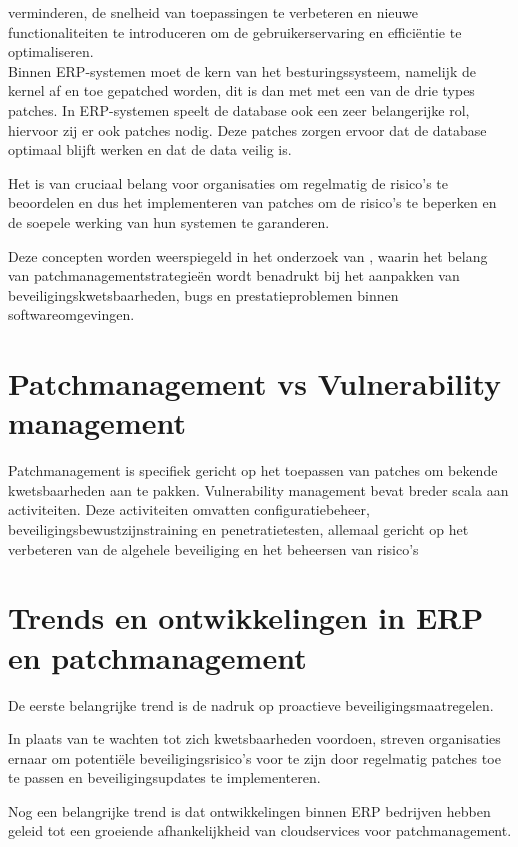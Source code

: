verminderen, de snelheid van toepassingen te verbeteren en nieuwe functionaliteiten te introduceren om de gebruikerservaring en efficiëntie te optimaliseren. \\

Binnen ERP-systemen moet de kern van het besturingssysteem, namelijk de kernel af en toe gepatched worden, dit is dan met met een van de drie types patches. In ERP-systemen speelt de database ook een zeer belangerijke rol, hiervoor zij er ook patches nodig. Deze patches zorgen ervoor dat de database optimaal blijft werken en dat de data veilig is.

Het is van cruciaal belang voor organisaties om regelmatig de risico's te beoordelen en dus het implementeren van patches om de risico's te beperken en de soepele werking van hun systemen te garanderen.

Deze concepten worden weerspiegeld in het onderzoek van \textcite{Wrobel2023}, waarin het belang van patchmanagementstrategieën wordt benadrukt bij het aanpakken van beveiligingskwetsbaarheden, bugs en prestatieproblemen binnen softwareomgevingen.

\section{Patchmanagement vs Vulnerability management}
Patchmanagement is specifiek gericht op het toepassen van patches om bekende kwetsbaarheden aan te pakken. Vulnerability management bevat breder scala aan activiteiten. Deze activiteiten omvatten configuratiebeheer, beveiligingsbewustzijnstraining en penetratietesten, allemaal gericht op het verbeteren van de algehele beveiliging en het beheersen van risico’s \autocite{Danby2023}


\section{Trends en ontwikkelingen in  ERP en patchmanagement}

De eerste belangrijke trend is de nadruk op proactieve beveiligingsmaatregelen.

In plaats van te wachten tot zich kwetsbaarheden voordoen, streven organisaties ernaar om potentiële beveiligingsrisico's voor te zijn door regelmatig patches toe te passen en beveiligingsupdates te implementeren.

Nog een belangrijke trend is dat ontwikkelingen binnen ERP bedrijven hebben geleid tot een groeiende afhankelijkheid van cloudservices voor patchmanagement.

